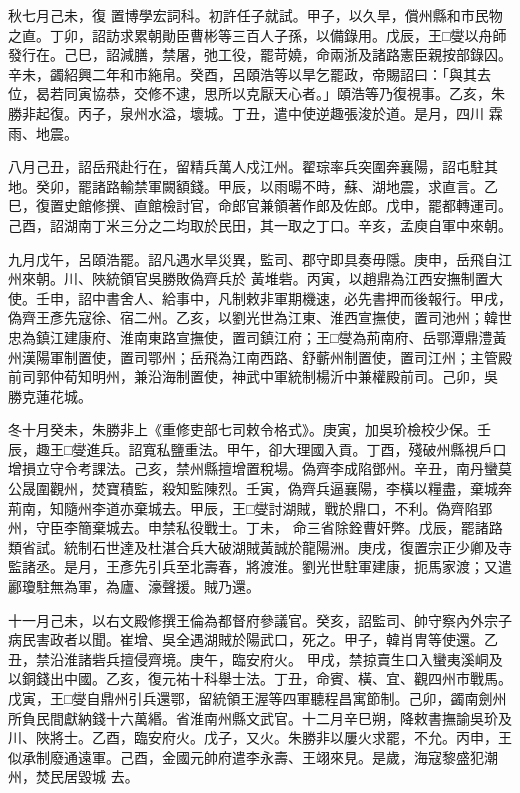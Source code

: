 \begin{pinyinscope}
 秋七月己未，復
 置博學宏詞科。初許任子就試。甲子，以久旱，償州縣和市民物之直。丁卯，詔訪求累朝勛臣曹彬等三百人子孫，以備錄用。戊辰，王□燮以舟師發行在。己巳，詔減膳，禁屠，弛工役，罷苛嬈，命兩浙及諸路憲臣親按部錄囚。辛未，蠲紹興二年和市絁帛。癸酉，呂頤浩等以旱乞罷政，帝賜詔曰：「與其去位，曷若同寅協恭，交修不逮，思所以克厭天心者。」頤浩等乃復視事。乙亥，朱勝非起復。丙子，泉州水溢，壞城。丁丑，遣中使逆趣張浚於道。是月，四川
 霖雨、地震。



 八月己丑，詔岳飛赴行在，留精兵萬人戍江州。翟琮率兵突圍奔襄陽，詔屯駐其地。癸卯，罷諸路輸禁軍闕額錢。甲辰，以雨暘不時，蘇、湖地震，求直言。乙巳，復置史館修撰、直館檢討官，命郎官兼領著作郎及佐郎。戊申，罷都轉運司。己酉，詔湖南丁米三分之二均取於民田，其一取之丁口。辛亥，孟庾自軍中來朝。



 九月戊午，呂頤浩罷。詔凡遇水旱災異，監司、郡守即具奏毋隱。庚申，岳飛自江州來朝。川、陜統領官吳勝敗偽齊兵於
 黃堆砦。丙寅，以趙鼎為江西安撫制置大使。壬申，詔中書舍人、給事中，凡制敕非軍期機速，必先書押而後報行。甲戌，偽齊王彥先寇徐、宿二州。乙亥，以劉光世為江東、淮西宣撫使，置司池州；韓世忠為鎮江建康府、淮南東路宣撫使，置司鎮江府；王□燮為荊南府、岳鄂潭鼎澧黃州漢陽軍制置使，置司鄂州；岳飛為江南西路、舒蘄州制置使，置司江州；主管殿前司郭仲荀知明州，兼沿海制置使，神武中軍統制楊沂中兼權殿前司。己卯，吳
 勝克蓮花城。



 冬十月癸未，朱勝非上《重修吏部七司敕令格式》。庚寅，加吳玠檢校少保。壬辰，趣王□燮進兵。詔寬私鹽重法。甲午，卻大理國入貢。丁酉，殘破州縣視戶口增損立守令考課法。己亥，禁州縣擅增置稅場。偽齊李成陷鄧州。辛丑，南丹蠻莫公晟圍觀州，焚寶積監，殺知監陳烈。壬寅，偽齊兵逼襄陽，李橫以糧盡，棄城奔荊南，知隨州李道亦棄城去。甲辰，王□燮討湖賊，戰於鼎口，不利。偽齊陷郢州，守臣李簡棄城去。申禁私役戰士。丁未，
 命三省除銓曹奸弊。戊辰，罷諸路類省試。統制石世達及杜湛合兵大破湖賊黃誠於龍陽洲。庚戌，復置宗正少卿及寺監諸丞。是月，王彥先引兵至北壽春，將渡淮。劉光世駐軍建康，扼馬家渡；又遣酈瓊駐無為軍，為廬、濠聲援。賊乃還。



 十一月己未，以右文殿修撰王倫為都督府參議官。癸亥，詔監司、帥守察內外宗子病民害政者以聞。崔增、吳全遇湖賊於陽武口，死之。甲子，韓肖冑等使還。乙丑，禁沿淮諸砦兵擅侵齊境。庚午，臨安府火。
 甲戌，禁掠賣生口入蠻夷溪峒及以銅錢出中國。乙亥，復元祐十科舉士法。丁丑，命賓、橫、宜、觀四州市戰馬。戊寅，王□燮自鼎州引兵還鄂，留統領王渥等四軍聽程昌寓節制。己卯，蠲南劍州所負民間獻納錢十六萬緡。省淮南州縣文武官。十二月辛巳朔，降敕書撫諭吳玠及川、陜將士。乙酉，臨安府火。戊子，又火。朱勝非以屢火求罷，不允。丙申，王似承制廢通遠軍。己酉，金國元帥府遣李永壽、王翊來見。是歲，海寇黎盛犯潮州，焚民居毀城
 去。




\end{pinyinscope}
